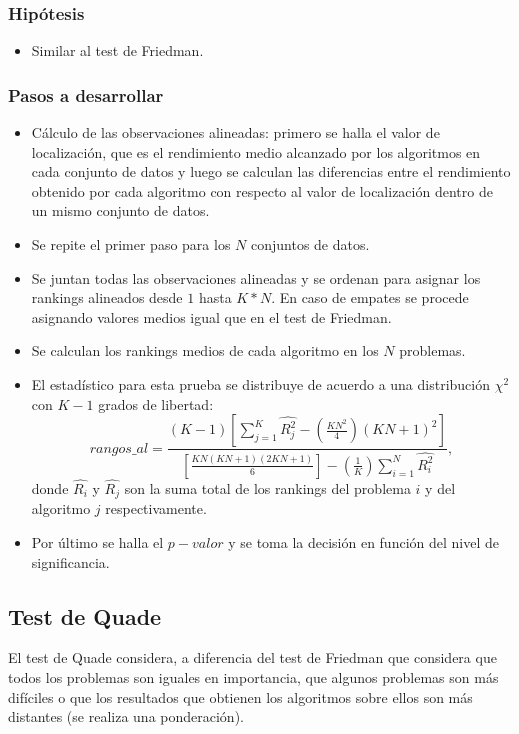 \subsubsection{Hipótesis}
\begin{itemize}
\item Similar al test de Friedman.
\end{itemize}

\subsubsection{Pasos a desarrollar}
\begin{itemize}
\item Cálculo de las observaciones alineadas: primero se halla el valor de localización, que es el rendimiento
medio alcanzado por los algoritmos en cada conjunto de datos y luego se calculan las diferencias entre el
rendimiento obtenido por cada algoritmo con respecto al valor de localización dentro de un mismo conjunto de
datos.
\item Se repite el primer paso para los $N$ conjuntos de datos.
\item Se juntan todas las observaciones alineadas y se ordenan para asignar los rankings alineados desde $1$
hasta $K*N$. En caso de empates se procede asignando valores medios igual que en el test de Friedman.
\item Se calculan los rankings medios de cada algoritmo en los $N$ problemas.
\item El estadístico para esta prueba se distribuye de acuerdo a una distribución $\chi^2$ con $K-1$ grados de
libertad:
\[ rangos\_al = \frac{(K-1) \left[ \sum_{j=1}^{K} \hat{R_{j}^{2}} - (\frac{KN^2}{4})(KN+1)^2 \right]}
{\left[\frac{KN(KN+1)(2KN+1)}{6}\right] - (\frac{1}{K}) \sum_{i=1}^{N} \hat{R_{i}^{2}}}, \]
donde $\hat{R_{i}}$ y $\hat{R_{j}}$ son la suma total de los rankings del problema $i$ y del algoritmo $j$
respectivamente.
\item Por último se halla el $p-valor$ y se toma la decisión en función del nivel de significancia.
\end{itemize}


\subsection{Test de Quade}
El test de Quade considera, a diferencia del test de Friedman que considera que todos los problemas son
iguales en importancia, que algunos problemas son más difíciles o que los resultados que obtienen los algoritmos
sobre ellos son más distantes (se realiza una ponderación).

